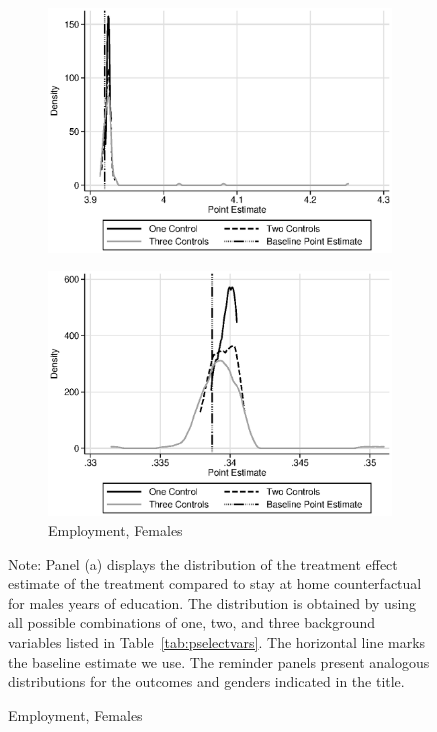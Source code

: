 \begin{figure}
\begin{subfigure}[h]{0.4\textwidth}
		\includegraphics[width=\textwidth]{output/sencontrols_female_years_30y_epan_ipw_P0.eps}
\end{subfigure}%
\begin{subfigure}[h]{0.4\textwidth}
	\centering
	\caption{Employment, Females}
		\includegraphics[width=\textwidth]{output/sencontrols_female_si30y_works_epan_ipw_P0.eps}
\end{subfigure}
\footnotesize \justify
Note: Panel (a) displays the distribution of the treatment effect estimate of the treatment compared to stay at home counterfactual for males years of education. The distribution is obtained by using all possible combinations of one, two, and three background variables listed in Table~\ref{tab:pselectvars}. The horizontal line marks the baseline estimate we use. The reminder panels present analogous distributions for the outcomes and genders indicated in the title.\\
\end{figure}

